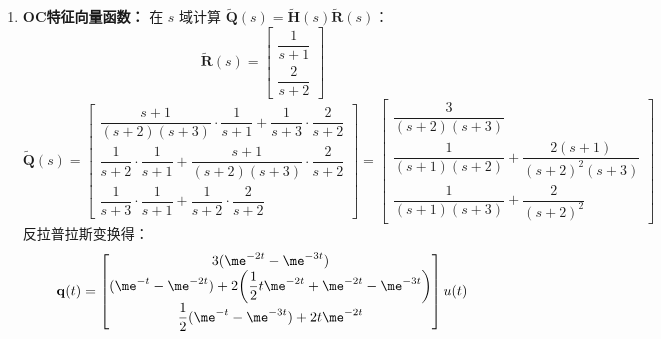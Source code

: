 \begin{example}[连续时间OC变换综合题]
\begin{enumerate}
        \item \textbf{OC特征向量函数：}
              在 $s$ 域计算 $\tilde{\mathbf{Q}}(s) = \tilde{\mathbf{H}}(s)\tilde{\mathbf{R}}(s)$：
              \begin{equation}
                  \tilde{\mathbf{R}}(s) = \begin{bmatrix}
                      \dfrac{1}{s+1} \\ \dfrac{2}{s+2}
                  \end{bmatrix}
              \end{equation}
              \begin{equation}
                  \tilde{\mathbf{Q}}(s) = \begin{bmatrix}
                      \dfrac{s+1}{(s+2)(s+3)}\cdot\dfrac{1}{s+1} + \dfrac{1}{s+3}\cdot\dfrac{2}{s+2} \\
                      \dfrac{1}{s+2}\cdot\dfrac{1}{s+1} + \dfrac{s+1}{(s+2)(s+3)}\cdot\dfrac{2}{s+2} \\
                      \dfrac{1}{s+3}\cdot\dfrac{1}{s+1} + \dfrac{1}{s+2}\cdot\dfrac{2}{s+2}
                  \end{bmatrix}
                  = \begin{bmatrix}
                      \dfrac{3}{(s+2)(s+3)}                                \\
                      \dfrac{1}{(s+1)(s+2)} + \dfrac{2(s+1)}{(s+2)^2(s+3)} \\
                      \dfrac{1}{(s+1)(s+3)} + \dfrac{2}{(s+2)^2}
                  \end{bmatrix}
              \end{equation}
              反拉普拉斯变换得：
              \begin{equation}
                  \mathbf{q}(t) = \begin{bmatrix}
                      3(\me^{-2t} - \me^{-3t})                                                                \\
                      (\me^{-t} - \me^{-2t}) + 2\!\left(\dfrac{1}{2}t\me^{-2t} + \me^{-2t} - \me^{-3t}\right) \\
                      \dfrac{1}{2}(\me^{-t} - \me^{-3t}) + 2t\me^{-2t}
                  \end{bmatrix} u(t)
              \end{equation}


\end{enumerate}
\end{example}
